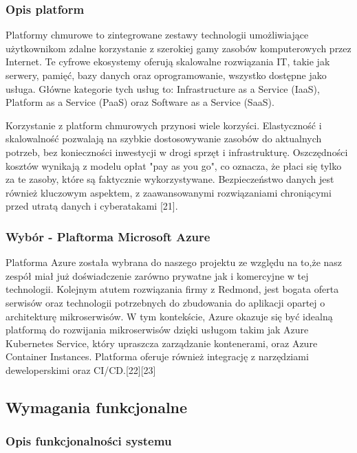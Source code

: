 \subsubsection{Opis platform}
Platformy chmurowe to zintegrowane zestawy technologii umożliwiające użytkownikom zdalne korzystanie z szerokiej gamy zasobów komputerowych przez Internet. Te cyfrowe ekosystemy oferują skalowalne rozwiązania IT, takie jak serwery, pamięć, bazy danych oraz oprogramowanie, wszystko dostępne jako usługa. Główne kategorie tych usług to: Infrastructure as a Service (IaaS), Platform as a Service (PaaS) oraz Software as a Service (SaaS).

Korzystanie z platform chmurowych przynosi wiele korzyści. Elastyczność i skalowalność pozwalają na szybkie dostosowywanie zasobów do aktualnych potrzeb, bez konieczności inwestycji w drogi sprzęt i infrastrukturę. Oszczędności kosztów wynikają z modelu opłat "pay as you go", co oznacza, że płaci się tylko za te zasoby, które są faktycznie wykorzystywane. Bezpieczeństwo danych jest również kluczowym aspektem, z zaawansowanymi rozwiązaniami chroniącymi przed utratą danych i cyberatakami [21].

\subsubsection{Wybór - Plaftorma Microsoft Azure}
Platforma Azure została wybrana do naszego projektu ze względu na to,że nasz zespół miał już doświadczenie zarówno prywatne jak i komercyjne w tej technologii. Kolejnym atutem rozwiązania firmy z Redmond, jest bogata oferta serwisów oraz technologii potrzebnych do zbudowania do aplikacji opartej o architekturę mikroserwisów.
W tym kontekście, Azure okazuje się być idealną platformą do rozwijania mikroserwisów dzięki usługom takim jak Azure Kubernetes Service, który upraszcza zarządzanie kontenerami, oraz Azure Container Instances. Platforma oferuje również integrację z narzędziami deweloperskimi oraz CI/CD.[22][23]

\clearpage

\subsection{Wymagania funkcjonalne}

\subsubsection{Opis funkcjonalności systemu}

